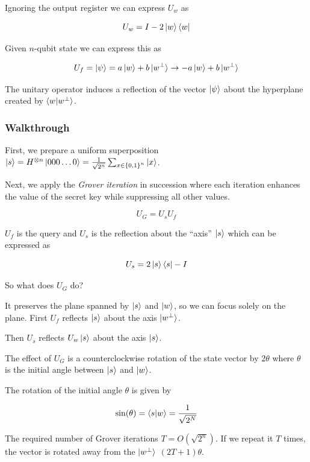 \documentclass[11pt]{article}
\begin{document}
Ignoring the output register we can express $U_w$ as

\[
	U_w = I - 2 \ket{w}\bra{w}
\]

Given $n$-qubit state we can express this as

\[
	U_f = \ket{\psi} = a\ket{w}+b\ket{w^\perp} \rightarrow -a\ket{w} + b\ket{w^\perp}
\]

The unitary operator induces a reflection of the vector $\ket{\psi}$ about the hyperplane created by $\braket{w | {w}^\perp}$.

\subsubsection{Walkthrough}

First, we prepare a uniform superposition $\ket{s} = {H}^{\otimes n}\ket{000 \dots 0} = \frac{1}{\sqrt{2^n}}\sum_{x \in {\{0,1\}}^n} \ket{x}$.

Next, we apply the \textit{Grover iteration} in succession where each iteration enhances the value of the secret key while suppressing all other values.


\begin{equation*}
	U_G = U_s U_f
\end{equation*}

$U_f$ is the query and $U_s$ is the reflection about the ``axis'' $\ket{s}$ which can be expressed as

\begin{equation*}
	U_s = 2\ket{s}\bra{s} - I
\end{equation*}

So what does $U_G$ do?

It preserves the plane spanned by $\ket{s}$ and $\ket{w}$, so we can focus solely on the plane. First $U_f$ reflects $\ket{s}$ about the axis $\ket{w^\perp}$.

Then $U_s$ reflects $U_w\ket{s}$ about the axis $\ket{s}$.

The effect of $U_G$ is  a counterclockwise rotation of the state vector by $2\theta$ where $\theta$ is the initial angle between $\ket{s}$ and $\ket{w}$.

The rotation of the initial angle $\theta$ is given by

\begin{equation*}
	\sin(\theta) = \braket{s|w} = \frac{1}{\sqrt{2^N}}
\end{equation*}

The required number of Grover iterations $T = O(\sqrt{2^n})$. If we repeat it $T$ times, the vector is rotated away from the $\ket{w^\perp}$ $(2T+1)\theta$.
\end{document}

